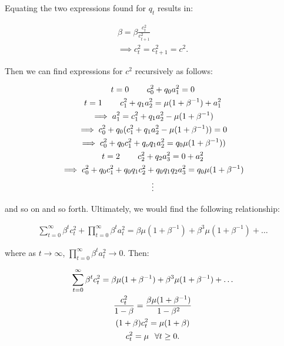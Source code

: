 \documentclass{article}
\begin{document}
Equating the two expressions found for $q_t$ results in:

\begin{gather*}
    \beta = \beta\frac{c^2_t}{c^2_{t+1}} \\
    \implies c_t^2 = c_{t+1}^2 = c^2.
\end{gather*}

Then we can find expressions for $c^2$ recursively as follows:

\begin{gather*}
    t = 0 \mbox{\hspace{0.3in}} c_0^2 + q_0a_1^2 = 0 \\
    t = 1 \mbox{\hspace{0.3in}} c_1^2+q_1a_2^2 = \mu(1+\beta^{-1})+a^2_1 \\
    \implies a^2_1 = c^2_1+q_1a^2_2-\mu(1+\beta^{-1}) \\
    \implies c^2_0 + q_0(c_1^2 + q_1a^2_2-\mu(1+\beta^{-1})) = 0 \\
    \implies c^2_0 + q_0c_1^2 + q_oq_1a^2_2 = q_0\mu(1+\beta^{-1})) \\
    t = 2 \mbox{\hspace{0.3in}} c_2^2 + q_2a_3^2 = 0 + a^2_2 \\
    \implies c_0^2 + q_0c_1^2 + q_0q_1c_2^2 + q_0q_1q_2a^2_3 = q_0\mu(1+\beta^{-1}) \\
    \vdots
\end{gather*}

and so on and so forth. Ultimately, we would find the following relationship:

\begin{gather*}
    \sum_{t=0}^\infty \beta^tc^2_t + \prod^\infty_{t=0} \beta^t a^2_t =  \beta\mu(1+\beta^{-1}) + \beta^3\mu(1+\beta^{-1}) + \hdots
\end{gather*}

where as $t \rightarrow \infty$, $\prod^\infty_{t=0} \beta^t a^2_t \rightarrow 0$. Then:

\begin{gather*}
    \sum_{t=0}^\infty \beta^tc^2_t =  \beta\mu(1+\beta^{-1}) + \beta^3\mu(1+\beta^{-1}) + \hdots \\
    \frac{c^2_t}{1-\beta} = \frac{\beta\mu(1+\beta^{-1})}{1-\beta^2} \\
    (1+\beta)c^2_t = \mu(1+\beta) \\
    c^2_t = \mu \mbox{\hspace{0.1in}} \forall t \geq 0.
\end{gather*}
\end{document}
